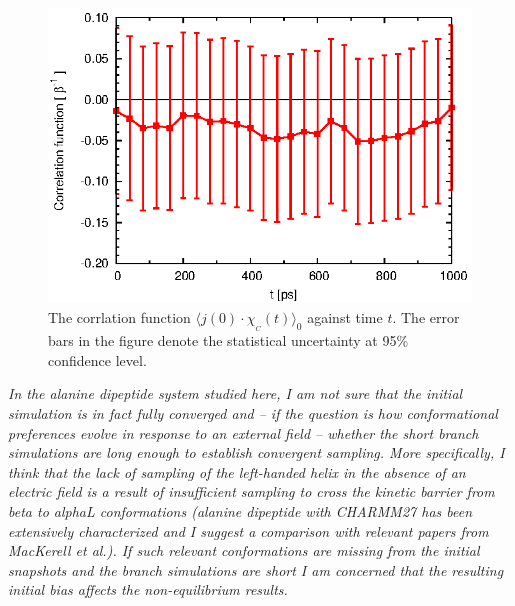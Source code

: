 \documentclass[]{revtex4-1}
\begin{document}
\begin{figure}
  \centering
  \includegraphics{figs/fig-corr-meta.eps}
  \caption{The corrlation function $\langle j(0)\cdot \chi_{_C}(t)
    \rangle_0$ against time $t$. The error bars in the figure denote
    the statistical uncertainty at 95\% confidence level. }
  \label{fig:tmp1}
\end{figure}


\emph{
In the alanine dipeptide system studied here, I am not sure that the
initial simulation is in fact fully converged and -- if the question is
how conformational preferences evolve in response to an external field
-- whether the short branch simulations are long enough to establish
convergent sampling. More specifically, I think that the lack of
sampling of the left-handed helix in the absence of an electric field
is a result of insufficient sampling to cross the kinetic barrier from
beta to alphaL conformations (alanine dipeptide with CHARMM27 has been
extensively characterized and I suggest a comparison with relevant
papers from MacKerell et al.). If such relevant conformations are
missing from the initial snapshots and the branch simulations are
short I am concerned that the resulting initial bias affects the
non-equilibrium results.
}\\
\end{document}
